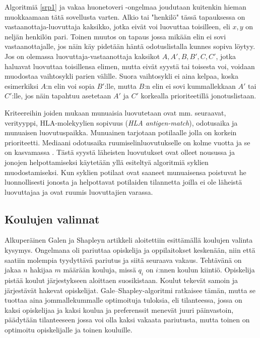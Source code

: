 \documentclass[finnish]{tktltiki2}
\theoremstyle{definition}
\theoremstyle{remark}
\begin{document}
Algoritmiä \ref{srp1} ja vakaa huonetoveri -ongelmaa joudutaan kuitenkin hieman muokkaamaan tätä sovellusta varten. Alkio tai "henkilö" tässä tapauksessa on vastaanottaja-luovuttaja kaksikko, jotka eivät voi luovuttaa toisilleen, eli ${x, y}$ on neljän henkilön pari. Toinen muutos on tapaus jossa mikään elin ei sovi vastaanottajalle, jos näin käy pidetään häntä odotuslistalla kunnes sopiva löytyy. Jos on olemassa luovuttaja-vastaanottaja kaksikot ${A, A'}, {B, B'}, {C, C'}$, jotka haluavat luovuttaa toisillensa elimen, mutta eivät syystä tai toisesta voi, voidaan muodostaa vaihtosykli parien välille. Suora vaihtosykli ei aina kelpaa, koska esimerkiksi $A$:n elin voi sopia $B'$:lle, mutta $B$:n elin ei sovi kummallekkaan $A'$ tai $C'$:lle, jos näin tapahtuu asetetaan $A'$ ja $C'$ korkealla prioriteetillä jonotuslistaan.

Kriteereihin joiden mukaan munuaisia luovutetaan ovat mm. seuraavat, verityyppi, HLA-molekyylien sopivuus (\emph{HLA antigen-match}), odotusaika ja munuaisen luovutuspaikka. Munuainen tarjotaan potilaalle jolla on korkein prioriteetti. Mediaani odotusaika ruumiselinluovutukselle on kolme vuotta ja se on kasvamassa \cite{NBERw10002}. Tästä syystä läheisten luovutukset ovat olleet nousussa ja jonojen helpottamiseksi käytetään yllä esiteltyä algoritmiä syklien muodostamiseksi. Kun syklien potilaat ovat saaneet munuaisensa poistuvat he luonnollisesti jonosta ja helpottavat potilaiden tilannetta joilla ei ole läheistä luovuttajaa ja ovat ruumis luovuttajien varassa.


\subsection{Koulujen valinnat}
Alkuperäinen Galen ja Shapleyn artikkeli \cite{gale62a} aloitettiin esittämällä koulujen valinta kysymys. Ongelmana oli pariuttaa opiskelija ja oppilaitokset keskenään, niin että saatiin molempia tyydyttävä pariutus ja siitä seuraava vakaus. Tehtävänä on jakaa $n$ hakijaa $m$ määrään kouluja, missä $q_{i}$ on $i$:nnen koulun kiintiö. Opiskelija pistää koulut järjestykseen aloittaen suosikistaan. Koulut tekevät samoin ja järjestävät hakevat opiskelijat. Gale--Shapley-algoritmi ratkaisee tämän, mutta se tuottaa aina jommallekummalle optimoituja tuloksia, eli tilanteessa, jossa on kaksi opiskelijaa ja kaksi koulua ja preferenssit menevät juuri päinvastoin, päädytään tilanteeseen jossa voi olla kaksi vakaata pariutusta, mutta toinen on optimoitu opiskelijalle ja toinen kouluille.
\end{document}
